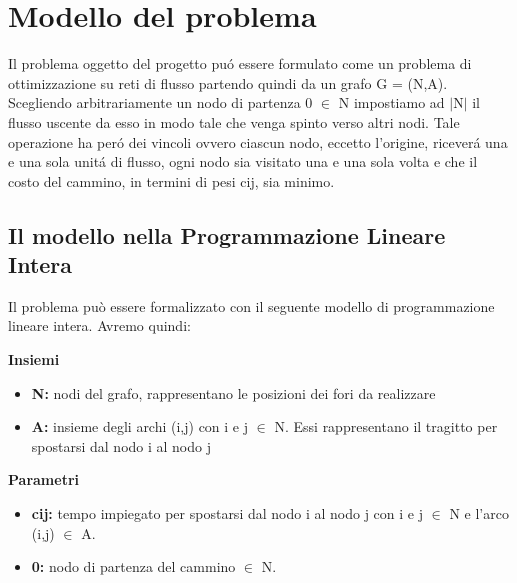 \documentclass[preprint,12pt]{elsarticle}
\begin{document}
\section{Modello del problema}
\label{S:1}
Il problema oggetto del progetto pu\'o essere formulato come un problema di ottimizzazione su reti di flusso partendo quindi da un grafo G = (N,A). Scegliendo arbitrariamente un nodo di partenza 0 $\in$ N impostiamo ad $\mid$N$\mid$ il flusso uscente da esso in modo tale che venga spinto verso altri nodi. Tale operazione ha per\'o dei vincoli ovvero ciascun nodo, eccetto l'origine, ricever\'a una e una sola unit\'a di flusso, ogni nodo sia visitato una e una sola volta e che il costo del cammino, in termini di pesi c{\tiny ij}, sia minimo.

\subsection{Il modello nella Programmazione Lineare Intera}

Il problema può essere formalizzato con il seguente modello di programmazione lineare intera. Avremo quindi:
\\

\begin{large}
\textbf{Insiemi}
\end{large}

\begin{itemize}
\item \textbf{N:} nodi del grafo, rappresentano le posizioni dei fori da realizzare
\item \textbf{A:} insieme degli archi (i,j) con i e j $\in$ N. Essi rappresentano il tragitto per spostarsi dal nodo i al nodo j\\

\end{itemize}

\begin{large}
\textbf{Parametri}
\end{large}

\begin{itemize}
\item \textbf{c{\tiny ij}:} tempo impiegato per spostarsi dal nodo i al nodo j con i e j $\in$ N e l'arco (i,j) $\in$ A.
\item \textbf{0:} nodo di partenza del cammino $\in$ N.\\

\end{itemize}
\end{document}
